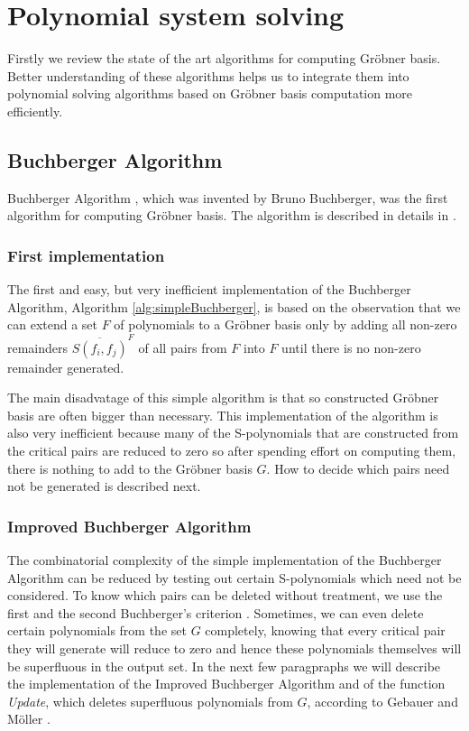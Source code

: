 \chapter{Polynomial system solving}
Firstly we review the state of the art algorithms for computing Gr\"obner basis. Better understanding of these algorithms helps us to integrate them into polynomial solving algorithms based on Gr\"obner basis computation more efficiently.

\section{Buchberger Algorithm}
Buchberger Algorithm \cite{Buchberger65}, which was invented by Bruno Buchberger, was the first algorithm for computing Gr\"obner basis. The algorithm is described in details in \cite{Becker93, Cox-Little-Shea97}.

\subsection{First implementation}
The first and easy, but very inefficient implementation of the Buchberger Algorithm, Algorithm \ref{alg:simpleBuchberger}, is based on the observation that we can extend a set $F$ of polynomials to a Gr\"obner basis only by adding all non-zero remainders $\overline{S(f_i, f_j)}^F$ of all pairs from $F$ into $F$ until there is no non-zero remainder generated.

The main disadvatage of this simple algorithm is that so constructed Gr\"obner basis are often bigger than necessary. This implementation of the algorithm is also very inefficient because many of the S-polynomials that are constructed from the critical pairs are reduced to zero so after spending effort on computing them, there is nothing to add to the Gr\"obner basis $G$. How to decide which pairs need not be generated is described next.



\subsection{Improved Buchberger Algorithm}
\label{subsec:ImprovedBuchberger}
The combinatorial complexity of the simple implementation of the Buchberger Algorithm can be reduced by testing out certain S-polynomials which need not be considered. To know which pairs can be deleted without treatment, we use the first and the second Buchberger's criterion \cite{Becker93}. Sometimes, we can even delete certain polynomials from the set $G$ completely, knowing that every critical pair they will generate will reduce to zero and hence these polynomials themselves will be superfluous in the output set. In the next few paragpraphs we will describe the implementation of the Improved Buchberger Algorithm and of the function \textit{Update}, which deletes superfluous polynomials from $G$, according to Gebauer and M\"oller \cite{Gebauer-Moller88}.

